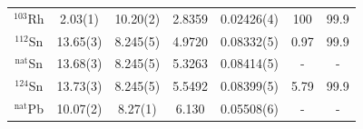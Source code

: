 \begin{table}[ht]
\begin{center}
\begin{tabular}{ c c c c c c c }
            $^{103}$Rh & 2.03(1) & 10.20(2) & 2.8359 & 0.02426(4) & 100 & 99.9\\

            $^{112}$Sn & 13.65(3) & 8.245(5) &
            4.9720 & 0.08332(5) & 0.97 & 99.9\\
            $^{\text{nat}}$Sn & 13.68(3) & 8.245(5) &
            5.3263 & 0.08414(5) & - & -\\
            $^{124}$Sn & 13.73(3) & 8.245(5) &
            5.5492 & 0.08399(5) & 5.79 & 99.9\\

            $^{\text{nat}}$Pb & 10.07(2) & 8.27(1) & 6.130 &
            0.05508(6) & - & -\\

            \hline
        \end{tabular}
    \end{center}
\end{table}

